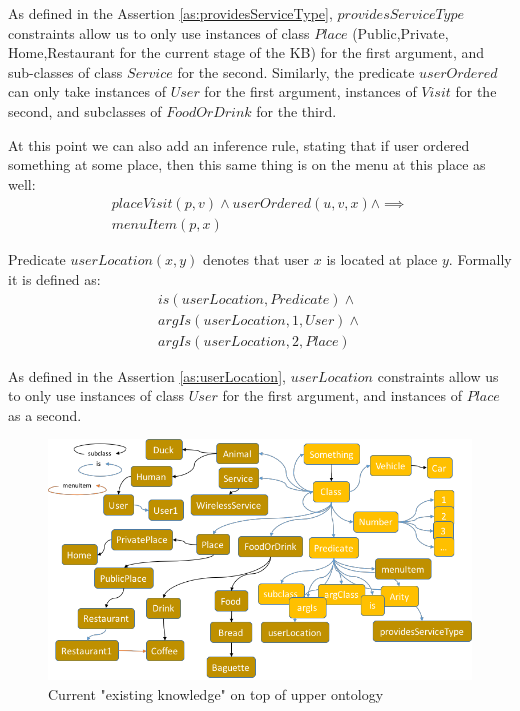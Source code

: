 As defined in the Assertion \ref{as:providesServiceType}, $providesServiceType$
constraints allow us to only use instances of class $Place$ (Public,Private,
Home,Restaurant for the current stage of the KB) for the first argument, and 
sub-classes of class $Service$ for the second. Similarly, the predicate
$userOrdered$ can only take instances of $User$ for the first argument, 
instances of $Visit$ for the second, and subclasses of $FoodOrDrink$ for the
third.

At this point we can also add an inference rule, stating that if user ordered
something at some place, then this same thing is on the menu at this place as
well:
\begin{equation}\label{rule:orderedMenu}
\begin{gathered}
	placeVisit(p,v) \land
	userOrdered(u,v,x) \land
	\implies \\
	menuItem(p,x) 
\end{gathered}
\end{equation}

\begin{definition}\label{def:userLocation}
Predicate $userLocation(x,y)$ denotes that user $x$ is located at place 
$y$. Formally it is defined as:
\begin{equation}\label{as:userLocation}
\begin{gathered}
    is(userLocation,Predicate) \land \\
	argIs(userLocation,1,User) \land\\
	argIs(userLocation,2, Place)
\end{gathered}
\end{equation}
\end{definition}
As defined in the Assertion \ref{as:userLocation}, $userLocation$
constraints allow us to only use instances of class $User$ for the first
argument, and instances of $Place$ as a second.

\begin{figure}[H]
	\centering
		\includegraphics[width=1\textwidth]{figures/fullExistingKB.png}
	\caption{Current "existing knowledge" on top of upper ontology}
	\label{fig:existingKB}
\end{figure}

